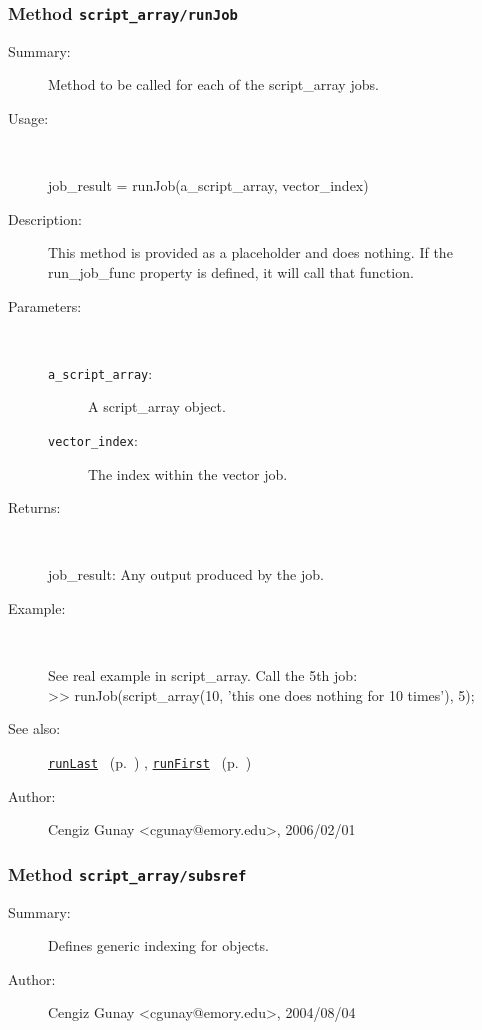 \subsubsection[Method \texttt{runJob}]{Method \texttt{script\_array/runJob}}%
%
\label{ref_script_array__runJob}%
\hypertarget{ref_script_array__runJob}{}%
\begin{description}
\item[Summary:]Method to be called for each of the script\_array jobs.
%
\item[Usage:]~%
\begin{lyxcode}%
job\_result = runJob(a\_script\_array, vector\_index)
%
\end{lyxcode}%
%
\item[Description:]%
This method is provided as a placeholder and does nothing. If the run\_job\_func
 property is defined, it will call that function.
\item[Parameters:]~
\begin{description}%
\item[\texttt{a\_script\_array}:]
 A script\_array object.
\item[\texttt{vector\_index}:]
 The index within the vector job.
\end{description}%
%
\item[Returns:]~

   job\_result: Any output produced by the job.
%
\item[Example:]~
\begin{lyxcode} See real example in script\_array. Call the 5th job:\\%
 >> runJob(script\_array(10, 'this one does nothing for 10 times'), 5);\\%
\end{lyxcode}
%
\item[See also:]%
\hyperlink{ref_runLast}{\texttt{runLast}}%
\ (p.~\pageref{ref_runLast})%
%
, \hyperlink{ref_runFirst}{\texttt{runFirst}}%
\ (p.~\pageref{ref_runFirst})%
%
%
\item[Author:]%
Cengiz Gunay <cgunay@emory.edu>, 2006/02/01%
\end{description}
\methodline%
\subsubsection[Method \texttt{subsref}]{Method \texttt{script\_array/subsref}}%
%
\label{ref_script_array__subsref}%
\hypertarget{ref_script_array__subsref}{}%
\begin{description}
\item[Summary:]Defines generic indexing for objects.
%
%
%
%
%
%
%
\item[Author:]%
Cengiz Gunay <cgunay@emory.edu>, 2004/08/04%
\end{description}
\methodline%
